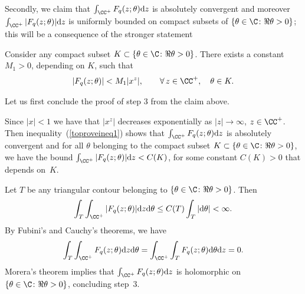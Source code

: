 Secondly, we claim that $\int_{\CC^+}{F_q(z; \theta){\rm d}z}$ is absolutely convergent and moreover $\int_{\CC^+}{|F_q(z; \theta)|{\rm d}z}$ is uniformly bounded on compact subsets of $\{\theta\in\C\colon \Re\theta > 0\}$; this will be a consequence of the stronger statement

\begin{claim}\label{bound1}
Consider any compact subset $K\subset\{\theta\in\C\colon \Re\theta > 0\}$. There exists a constant $M_1> 0$, depending on $K$, such that
\begin{gather}\label{toproveineq1}
|F_q(z; \theta)| < M_1 |x^z|, \qquad \forall\, z\in\CC^+,\quad \theta\in K.
\end{gather}
\end{claim}

Let us f\/irst conclude the proof of step 3 from the claim above.

Since $|x| < 1$ we have that $|x^z|$ decreases exponentially as $|z|\rightarrow\infty$, $z\in\CC^+$. Then inequality~(\ref{toproveineq1}) shows that $\int_{\CC^+}{F_q(z; \theta){\rm d}z}$ is absolutely convergent and for all $\theta$ belonging to the compact subset $K\subset\{\theta\in\C\colon \Re\theta > 0\}$, we have the bound $\int_{\CC^+}{|F_q(z; \theta)|{\rm d}z} < C(K)$, for some constant $C(K) > 0$ that depends on~$K$.

Let $T$ be any triangular contour belonging to $\{\theta\in\C\colon \Re\theta > 0\}$. Then
\begin{gather*}
\int_T{\int_{\CC^+}{|F_q(z; \theta)|{\rm d}z}{\rm d}\theta} \leq C(T)\int_T{|{\rm d}\theta|} < \infty.
 \end{gather*}
 By Fubini's and Cauchy's theorems, we have \begin{gather*}
 \int_T{\int_{\CC^+}{F_q(z; \theta){\rm d}z}{\rm d}\theta} = \int_{\CC^+}\int_{T}{{F_q(z; \theta){\rm d}\theta}{\rm d}z} = 0.
 \end{gather*}
Morera's theorem implies that $\int_{\CC^+}{F_q(z; \theta){\rm d}z}$ is holomorphic on $\{\theta\in\C\colon \Re\theta > 0\}$, concluding step~3.

